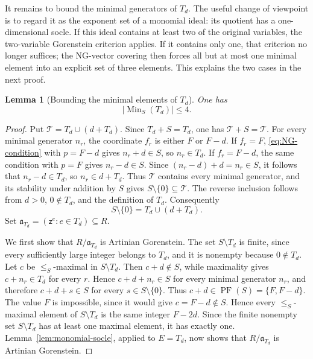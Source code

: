 \documentclass[10pt]{amsart}
\theoremstyle{plain}
\newtheorem{lemma}{Lemma}[section]
\begin{document}
It remains to bound the minimal generators of \(T_d\).
The useful change of viewpoint is to regard it as the exponent set of a
monomial ideal: its quotient has a one-dimensional socle.  If this ideal
contains at least two of the original variables, the two-variable
Gorenstein criterion applies.  If it contains only one, that criterion
no longer suffices; the NG-vector covering then forces all but at most
one minimal element into an explicit set of three elements.  This
explains the two cases in the next proof.

\begin{lemma}[Bounding the minimal elements of \(T_d\)]\label{lem:type2-Td-bound}
One has
\[
|\operatorname{Min}_S(T_d)|\le4.
\]
\end{lemma}

\begin{proof}
Put \(\mathcal T=T_d\cup(d+T_d)\).  Since \(T_d+S=T_d\), one has
\(\mathcal T+S=\mathcal T\).  For every minimal generator \(n_r\),
the coordinate \(f_r\) is either \(F\) or \(F-d\).  If \(f_r=F\),
\eqref{eq:NG-condition} with \(p=F-d\) gives \(n_r+d\in S\), so
\(n_r\in T_d\).  If \(f_r=F-d\), the same condition with \(p=F\)
gives \(n_r-d\in S\).  Since \((n_r-d)+d=n_r\in S\), it follows
that \(n_r-d\in T_d\), so \(n_r\in d+T_d\).
Thus \(\mathcal T\) contains every minimal generator, and its stability
under addition by \(S\) gives \(S\setminus\{0\}\subseteq\mathcal T\).
The reverse inclusion follows from \(d>0\), \(0\notin T_d\), and the
definition of \(T_d\).  Consequently
\begin{equation}\label{eq:type2-Td-union}
S\setminus\{0\}=T_d\cup(d+T_d).
\end{equation}
Set \(\mathfrak a_{T_d}=(\mathsf z^e:e\in T_d)\subseteq R\).

We first show that \(R/\mathfrak a_{T_d}\) is Artinian Gorenstein.
The set \(S\setminus T_d\) is finite, since every sufficiently large
integer belongs to \(T_d\), and it is nonempty because \(0\notin T_d\).
Let \(c\) be \(\le_S\)-maximal in \(S\setminus T_d\).
Then \(c+d\notin S\), while maximality gives \(c+n_r\in T_d\) for
every \(r\).  Hence \(c+d+n_r\in S\) for every minimal generator
\(n_r\), and therefore \(c+d+s\in S\) for every
\(s\in S\setminus\{0\}\).  Thus
\(c+d\in\operatorname{PF}(S)=\{F,F-d\}\).
The value \(F\) is impossible, since it would give
\(c=F-d\notin S\).  Hence every \(\le_S\)-maximal element of
\(S\setminus T_d\) is the same integer \(F-2d\).  Since the finite
nonempty set \(S\setminus T_d\) has at least one maximal element, it
has exactly one.  Lemma~\ref{lem:monomial-socle}, applied to
\(E=T_d\), now shows that \(R/\mathfrak a_{T_d}\) is Artinian
Gorenstein.


\end{proof}
\end{document}
